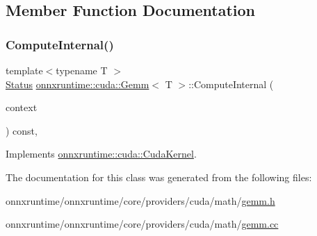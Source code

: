 \subsection{Member Function Documentation}
\mbox{\label{classonnxruntime_1_1cuda_1_1Gemm_a932d9e5843b6350ad6d97247d4a162e0}} 
\subsubsection{\texorpdfstring{Compute\+Internal()}{ComputeInternal()}}
{\footnotesize\ttfamily template$<$typename T $>$ \\
\mbox{\hyperlink{classonnxruntime_1_1common_1_1Status}{Status}} \mbox{\hyperlink{classonnxruntime_1_1cuda_1_1Gemm}{onnxruntime\+::cuda\+::\+Gemm}}$<$ T $>$\+::Compute\+Internal (\begin{DoxyParamCaption}\item[{\mbox{\hyperlink{classonnxruntime_1_1OpKernelContext}{Op\+Kernel\+Context}} $\ast$}]{context }\end{DoxyParamCaption}) const\hspace{0.3cm}{\ttfamily [override]}, {\ttfamily [virtual]}}



Implements \mbox{\hyperlink{classonnxruntime_1_1cuda_1_1CudaKernel_aca7af04ae448017d6023d30bba231ebb}{onnxruntime\+::cuda\+::\+Cuda\+Kernel}}.



The documentation for this class was generated from the following files\+:\begin{DoxyCompactItemize}
\item 
onnxruntime/onnxruntime/core/providers/cuda/math/\mbox{\hyperlink{cuda_2math_2gemm_8h}{gemm.\+h}}\item 
onnxruntime/onnxruntime/core/providers/cuda/math/\mbox{\hyperlink{cuda_2math_2gemm_8cc}{gemm.\+cc}}\end{DoxyCompactItemize}
